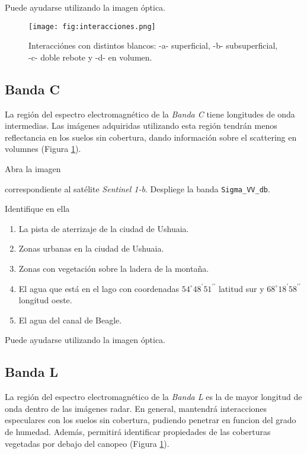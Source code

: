 Puede ayudarse utilizando la imagen óptica.

\begin{figure}[h!]
    \centering
    \texttt{[image: fig:interacciones.png]}
    \caption{Interacciónes con distintos blancos: -a- superficial, -b- subsuperficial, -c- doble rebote y -d- en volumen.}
    \label{fig:interacciones}
\end{figure}


\subsection{Banda C}

La región del espectro electromagnético de la \emph{Banda C} tiene longitudes de onda intermedias. Las imágenes adquiridas utilizando esta región tendrán menos reflectancia en los suelos sin cobertura, dando información sobre el scattering en volumnes (Figura \ref{fig:interacciones}).

Abra la imagen
\begin{center}
  \end{center}

correspondiente al satélite \emph{Sentinel 1-b}. Despliege la banda \texttt{Sigma\_VV\_db}.

Identifique en ella

\begin{enumerate}
    \item La pista de aterrizaje de la ciudad de Ushuaia.
    \item Zonas urbanas en la ciudad de Ushuaia.
    \item Zonas con vegetación sobre la ladera de la montaña.
    \item El agua que está en el lago con coordenadas $54^\circ 48^\prime 51^{\prime\prime}$ latitud sur y $68^\circ 18^\prime 58^{\prime\prime}$ longitud oeste.
    \item El agua del canal de Beagle.
\end{enumerate}

Puede ayudarse utilizando la imagen óptica.

\subsection{Banda L}

La región del espectro electromagnético de la \emph{Banda L} es la de mayor longitud de onda dentro de las imágenes radar. En general, mantendrá interacciones especulares con los suelos sin cobertura, pudiendo penetrar en funcion del grado de humedad. Además, permitirá identificar propiedades de las coberturas vegetadas por debajo del canopeo (Figura \ref{fig:interacciones}).

